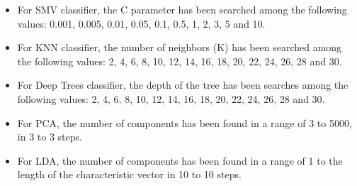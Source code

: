 \begin{itemize}
\item For SMV classifier, the C parameter has been searched among the following values: 0.001, 0.005, 0.01, 0.05, 0.1, 0.5, 1, 2, 3, 5 and 10.
\item For KNN classifier, the number of neighbors (K) has been searched among the following values: 2, 4, 6, 8, 10, 12, 14, 16, 18, 20, 22, 24, 26, 28 and 30.
\item For Deep Trees classifier, the depth of the tree has been searches among the following values: 2, 4, 6, 8, 10, 12, 14, 16, 18, 20, 22, 24, 26, 28 and 30.
\item For PCA, the number of components has been found in a range of 3 to 5000, in 3 to 3 steps.
\item For LDA, the number of components has been found in a range of 1 to the length of the characteristic vector in 10 to 10 steps.
\end{itemize}

\clearpage
